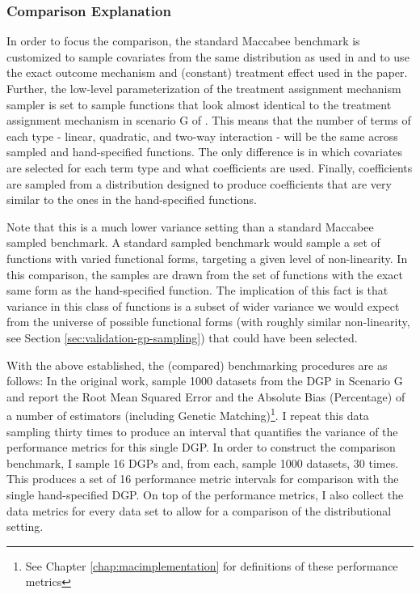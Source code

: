 \documentclass[../main.tex]{subfiles}
\begin{document}
\subsubsection{Comparison Explanation}

In order to focus the comparison, the standard Maccabee benchmark is customized to sample covariates from the same distribution as used in \textcite{Diamond2012GeneticStudies} and to use the exact outcome mechanism and (constant) treatment effect used in the paper. Further, the low-level parameterization of the treatment assignment mechanism sampler is set to sample functions that look almost identical to the treatment assignment mechanism in scenario G of \textcite{Diamond2012GeneticStudies}. This means that the number of terms of each type - linear, quadratic, and two-way interaction - will be the same across sampled and hand-specified functions. The only difference is in which covariates are selected for each term type and what coefficients are used. Finally, coefficients are sampled from a distribution designed to produce coefficients that are very similar to the ones in the hand-specified functions.

\vspace{\baselineskip}

Note that this is a much lower variance setting than a standard Maccabee sampled benchmark. A standard sampled benchmark would sample a set of functions with varied functional forms, targeting a given level of non-linearity. In this comparison, the samples are drawn from the set of functions with the exact same form as the hand-specified function. The implication of this fact is that variance in this class of functions is a subset of wider variance we would expect from the universe of possible functional forms (with roughly similar non-linearity, see Section \ref{sec:validation-gp-sampling}) that could have been selected.

\vspace{\baselineskip}

With the above established, the (compared) benchmarking procedures are as follows: In the original work, \citeauthor{Diamond2012GeneticStudies} sample 1000 datasets from the DGP in Scenario G and report the Root Mean Squared Error and the Absolute Bias (Percentage) of a number of estimators (including Genetic Matching)\footnote{See Chapter \ref{chap:macimplementation} for definitions of these performance metrics}. I repeat this data sampling thirty times to produce an interval that quantifies the variance of the performance metrics for this single DGP. In order to construct the comparison benchmark, I sample 16 DGPs and, from each, sample 1000 datasets, 30 times. This produces a set of 16 performance metric intervals for comparison with the single hand-specified DGP. On top of the performance metrics, I also collect the data metrics for every data set to allow for a comparison of the distributional setting.
\end{document}
